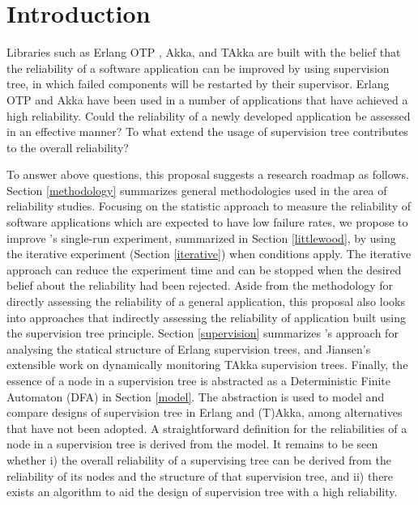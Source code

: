 \documentclass[12pt, authoryear]{article}
\begin{document}
\maketitle

\section{Introduction}\label{introduction}

Libraries such as Erlang OTP \citep{OTP}, Akka\citep{akka_doc}, and TAkka are 
built with the belief that the reliability of a software application can be 
improved by using supervision 
tree, in which failed components will be restarted by their supervisor.  Erlang 
OTP and Akka have been used in a number of applications that have achieved a
high reliability.  Could the reliability of a newly developed 
application be assessed in an effective manner? To what extend the usage of 
supervision tree contributes to the overall reliability?  

To answer above questions, this proposal suggests a research roadmap as follows.
Section \ref{methodology} summarizes general methodologies used in the area 
of reliability studies.  Focusing on the statistic approach to measure the 
reliability of software applications which are expected to have low failure 
rates, we propose to improve \citep{Littlewood93}'s single-run experiment, 
summarized in Section \ref{littlewood}, by using the iterative experiment 
(Section \ref{iterative}) when conditions apply.  The iterative approach can 
reduce the experiment time and can be stopped when the desired belief about the 
reliability had been rejected.  Aside from the methodology for directly 
assessing the reliability of a general application, this proposal also looks 
into approaches that indirectly assessing the reliability of application built 
using the supervision tree principle.   Section \ref{supervision} summarizes 
\citeauthor{JanHenry}'s approach for analysing the statical structure of Erlang 
supervision trees, and Jiansen's extensible work on dynamically monitoring 
TAkka supervision trees.  Finally, the essence of a node in a supervision tree 
is abstracted as a Deterministic Finite Automaton (DFA) in Section \ref{model}. 
The abstraction is used to model and compare designs of supervision tree in 
Erlang and (T)Akka, among alternatives that have not been adopted.  A 
straightforward definition for the reliabilities of a node in a supervision 
tree is derived from the model.  It remains to be seen whether i) the overall 
reliability of a supervising tree can be derived from the reliability of its 
nodes and the structure of that supervision tree, and ii) there exists an 
algorithm to aid the design of supervision tree with a high reliability.
\end{document}
